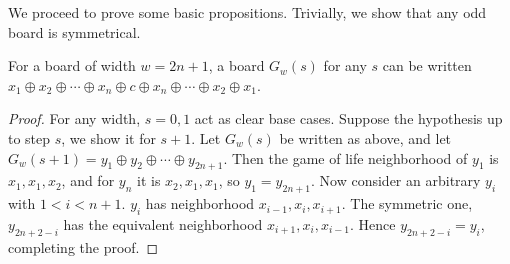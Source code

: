 \documentclass[12pt,letterpaper]{article}
\begin{document}
\noindent We proceed to prove some basic propositions. Trivially, we show that any odd board is symmetrical.
\begin{prop} \label{symmetry}
  For a board of width $w=2n+1$, a board $G_w(s)$ for any $s$ can be written $x_1\oplus x_2\oplus\cdots\oplus x_n\oplus c \oplus x_n\oplus\cdots\oplus x_2\oplus x_1$.
\end{prop}
\begin{proof}
  For any width, $s=0,1$ act as clear base cases. Suppose the hypothesis up to step $s$, we show it for $s+1$. Let $G_w(s)$ be written as above, and let $G_w(s+1)=y_1\oplus y_2\oplus\cdots\oplus y_{2n+1}$. Then the game of life neighborhood of $y_1$ is $x_1,x_1,x_2$, and for $y_n$ it is $x_2,x_1,x_1$, so $y_1=y_{2n+1}$. Now consider an arbitrary $y_i$ with $1<i<n+1$. $y_i$ has neighborhood $x_{i-1},x_i,x_{i+1}$. The symmetric one, $y_{2n+2-i}$ has the equivalent neighborhood $x_{i+1},x_i,x_{i-1}$. Hence $y_{2n+2-i}=y_i$, completing the proof.
\end{proof}
\end{document}
